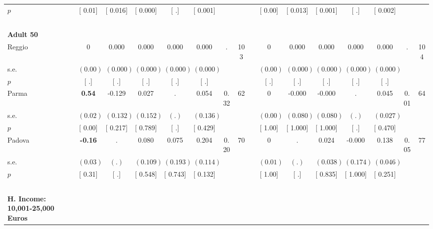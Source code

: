 \begin{longtable}{L{8em} c c c c c c c p{1em} c c c c c c c}
\quad \quad \quad \quad $ p$ & [     0.01] & [    0.016] & [    0.000] & [        .] & [    0.001] & & & & [     0.00] & [    0.013] & [    0.001] & [        .] & [    0.002] & &  \\[1em]
~\\[1em]
\quad \quad \textbf{Adult 50} & & & & & & & & & & & & & & & \\* 
\quad \quad \quad Reggio& 0 &     0.000 &     0.000 &     0.000 &     0.000 &         . &       103 & & 0 &     0.000 &     0.000 &     0.000 &     0.000 &         . &       104  \\*
\quad \quad \quad \quad s.e.& $ (     0.00)$ & $ (    0.000)$ & $ (    0.000)$ & $ (    0.000)$ & $ (    0.000)$ & & & & $ (     0.00)$ & $ (    0.000)$ & $ (    0.000)$ & $ (    0.000)$ & $ (    0.000)$ & &  \\*
\quad \quad \quad \quad $ p$ & [        .] & [        .] & [        .] & [        .] & [        .] & & & & [        .] & [        .] & [        .] & [        .] & [        .] & &  \\[1em]
\quad \quad \quad Parma& \textbf{     0.54} &    -0.129 &     0.027 &         . &     0.054 &      0.32 &        62 & & 0 &    -0.000 &    -0.000 &         . &     0.045 &      0.01 &        64  \\*
\quad \quad \quad \quad s.e.& $ (     0.02)$ & $ (    0.132)$ & $ (    0.152)$ & $ (        .)$ & $ (    0.136)$ & & & & $ (     0.00)$ & $ (    0.080)$ & $ (    0.080)$ & $ (        .)$ & $ (    0.027)$ & &  \\*
\quad \quad \quad \quad $ p$ & [     0.00] & [    0.217] & [    0.789] & [        .] & [    0.429] & & & & [     1.00] & [    1.000] & [    1.000] & [        .] & [    0.470] & &  \\[1em]
\quad \quad \quad Padova& \textbf{    -0.16} &         . &     0.080 &     0.075 &     0.204 &      0.20 &        70 & & 0 &         . &     0.024 &    -0.000 &     0.138 &      0.05 &        77  \\*
\quad \quad \quad \quad s.e.& $ (     0.03)$ & $ (        .)$ & $ (    0.109)$ & $ (    0.193)$ & $ (    0.114)$ & & & & $ (     0.01)$ & $ (        .)$ & $ (    0.038)$ & $ (    0.174)$ & $ (    0.046)$ & &  \\*
\quad \quad \quad \quad $ p$ & [     0.31] & [        .] & [    0.548] & [    0.743] & [    0.132] & & & & [     1.00] & [        .] & [    0.835] & [    1.000] & [    0.251] & &  \\[1em]
~\\[1em]
\textbf{H. Income: 10,001-25,000 Euros} \\*

\end{longtable}
